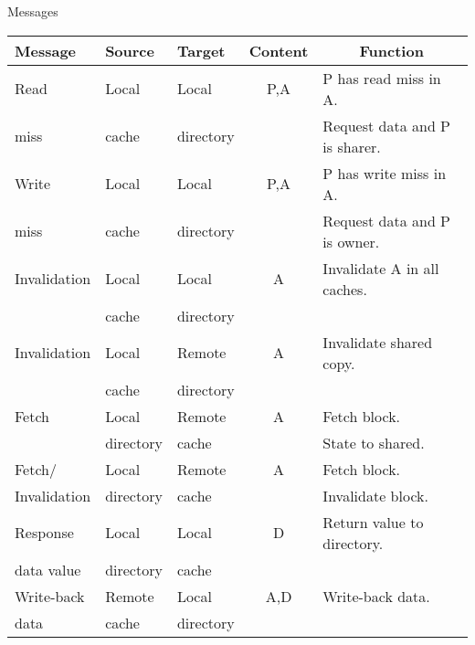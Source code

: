 \begin{frame}[t]{Messages}

{
\scriptsize
\begin{tabular}{|p{6.2em}|p{4em}|l|c|l|}

\hline
Message & Source & Target & Content & \multicolumn{1}{c|}{Function} \\
\hline
\hline

Read & Local & Local & P,A & P has read miss in A.\\
miss & cache & directory & & Request data and P is sharer.\pause\\
\hline

Write & Local & Local & P,A & P has write miss in A.\\
miss & cache & directory & & Request data and P is owner.\pause\\
\hline

Invalidation & Local & Local & A & Invalidate A in all caches.\\
& cache & directory & & \pause \\
\hline

Invalidation & Local & Remote & A & Invalidate shared copy.\\
& cache & directory & & \pause \\
\hline

Fetch & Local & Remote & A & Fetch block.\\
& directory & cache & & State to shared.\pause\\
\hline

Fetch/ & Local & Remote & A & Fetch block.\\
Invalidation & directory & cache & & Invalidate block.\pause\\
\hline

Response & Local & Local & D & Return value to directory.\\
data value & directory & cache & & \pause\\
\hline

Write-back & Remote & Local & A,D & Write-back data.\\
data & cache & directory & & \\
\hline
\end{tabular}
}
\end{frame}
